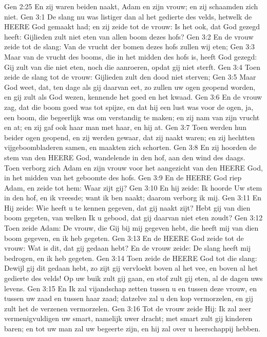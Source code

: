 Gen 2:25  En zij waren beiden naakt, Adam en zijn vrouw; en zij schaamden zich niet.
Gen 3:1  De slang nu was listiger dan al het gedierte des velds, hetwelk de HEERE God gemaakt had; en zij zeide tot de vrouw: Is het ook, dat God gezegd heeft: Gijlieden zult niet eten van allen boom dezes hofs?
Gen 3:2  En de vrouw zeide tot de slang: Van de vrucht der bomen dezes hofs zullen wij eten;
Gen 3:3  Maar van de vrucht des booms, die in het midden des hofs is, heeft God gezegd: Gij zult van die niet eten, noch die aanroeren, opdat gij niet sterft.
Gen 3:4  Toen zeide de slang tot de vrouw: Gijlieden zult den dood niet sterven;
Gen 3:5  Maar God weet, dat, ten dage als gij daarvan eet, zo zullen uw ogen geopend worden, en gij zult als God wezen, kennende het goed en het kwaad.
Gen 3:6  En de vrouw zag, dat die boom goed was tot spijze, en dat hij een lust was voor de ogen, ja, een boom, die begeerlijk was om verstandig te maken; en zij nam van zijn vrucht en at; en zij gaf ook haar man met haar, en hij at.
Gen 3:7  Toen werden hun beider ogen geopend, en zij werden gewaar, dat zij naakt waren; en zij hechtten vijgeboombladeren samen, en maakten zich schorten.
Gen 3:8  En zij hoorden de stem van den HEERE God, wandelende in den hof, aan den wind des daags. Toen verborg zich Adam en zijn vrouw voor het aangezicht van den HEERE God, in het midden van het geboomte des hofs.
Gen 3:9  En de HEERE God riep Adam, en zeide tot hem: Waar zijt gij?
Gen 3:10  En hij zeide: Ik hoorde Uw stem in den hof, en ik vreesde; want ik ben naakt; daarom verborg ik mij.
Gen 3:11  En Hij zeide: Wie heeft u te kennen gegeven, dat gij naakt zijt? Hebt gij van dien boom gegeten, van welken Ik u gebood, dat gij daarvan niet eten zoudt?
Gen 3:12  Toen zeide Adam: De vrouw, die Gij bij mij gegeven hebt, die heeft mij van dien boom gegeven, en ik heb gegeten.
Gen 3:13  En de HEERE God zeide tot de vrouw: Wat is dit, dat gij gedaan hebt? En de vrouw zeide: De slang heeft mij bedrogen, en ik heb gegeten.
Gen 3:14  Toen zeide de HEERE God tot die slang: Dewijl gij dit gedaan hebt, zo zijt gij vervloekt boven al het vee, en boven al het gedierte des velds! Op uw buik zult gij gaan, en stof zult gij eten, al de dagen uws levens.
Gen 3:15  En Ik zal vijandschap zetten tussen u en tussen deze vrouw, en tussen uw zaad en tussen haar zaad; datzelve zal u den kop vermorzelen, en gij zult het de verzenen vermorzelen.
Gen 3:16  Tot de vrouw zeide Hij: Ik zal zeer vermenigvuldigen uw smart, namelijk uwer dracht; met smart zult gij kinderen baren; en tot uw man zal uw begeerte zijn, en hij zal over u heerschappij hebben.
